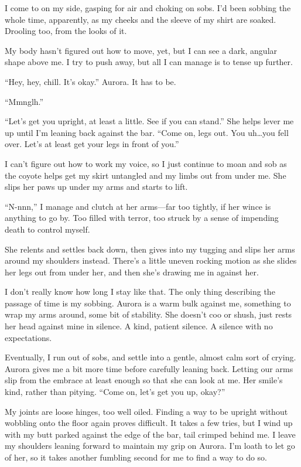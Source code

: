 I come to on my side, gasping for air and choking on sobs. I'd been sobbing the whole time, apparently, as my cheeks and the sleeve of my shirt are soaked. Drooling too, from the looks of it.

My body hasn't figured out how to move, yet, but I can see a dark, angular shape above me. I try to push away, but all I can manage is to tense up further.

``Hey, hey, chill. It's okay.'' Aurora. It has to be.

``Mmnglh.''

``Let's get you upright, at least a little. See if you can stand.'' She helps lever me up until I'm leaning back against the bar. ``Come on, legs out. You uh\ldots{}you fell over. Let's at least get your legs in front of you.''

I can't figure out how to work my voice, so I just continue to moan and sob as the coyote helps get my skirt untangled and my limbs out from under me. She slips her paws up under my arms and starts to lift.

``N-nnn,'' I manage and clutch at her arms---far too tightly, if her wince is anything to go by. Too filled with terror, too struck by a sense of impending death to control myself.

She relents and settles back down, then gives into my tugging and slips her arms around my shoulders instead. There's a little uneven rocking motion as she slides her legs out from under her, and then she's drawing me in against her.

I don't really know how long I stay like that. The only thing describing the passage of time is my sobbing. Aurora is a warm bulk against me, something to wrap my arms around, some bit of stability. She doesn't coo or shush, just rests her head against mine in silence. A kind, patient silence. A silence with no expectations.

Eventually, I run out of sobs, and settle into a gentle, almost calm sort of crying. Aurora gives me a bit more time before carefully leaning back. Letting our arms slip from the embrace at least enough so that she can look at me. Her smile's kind, rather than pitying. ``Come on, let's get you up, okay?''

My joints are loose hinges, too well oiled. Finding a way to be upright without wobbling onto the floor again proves difficult. It takes a few tries, but I wind up with my butt parked against the edge of the bar, tail crimped behind me. I leave my shoulders leaning forward to maintain my grip on Aurora. I'm loath to let go of her, so it takes another fumbling second for me to find a way to do so.

